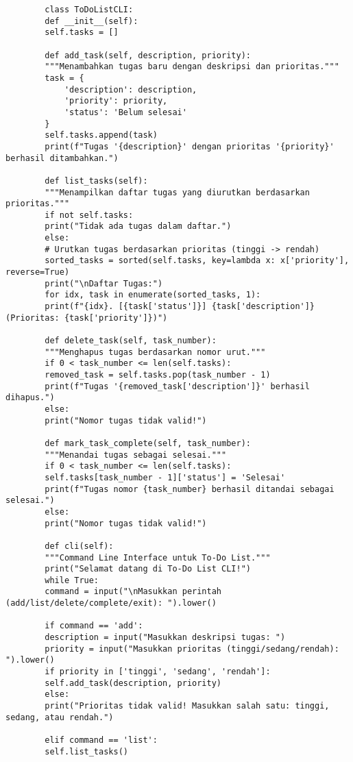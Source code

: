 \documentclass[12pt]{article}
\begin{document}
	
	\begin{lstlisting}
		class ToDoListCLI:
		def __init__(self):
		self.tasks = []
		
		def add_task(self, description, priority):
		"""Menambahkan tugas baru dengan deskripsi dan prioritas."""
		task = {
			'description': description,
			'priority': priority,
			'status': 'Belum selesai'
		}
		self.tasks.append(task)
		print(f"Tugas '{description}' dengan prioritas '{priority}' berhasil ditambahkan.")
		
		def list_tasks(self):
		"""Menampilkan daftar tugas yang diurutkan berdasarkan prioritas."""
		if not self.tasks:
		print("Tidak ada tugas dalam daftar.")
		else:
		# Urutkan tugas berdasarkan prioritas (tinggi -> rendah)
		sorted_tasks = sorted(self.tasks, key=lambda x: x['priority'], reverse=True)
		print("\nDaftar Tugas:")
		for idx, task in enumerate(sorted_tasks, 1):
		print(f"{idx}. [{task['status']}] {task['description']} (Prioritas: {task['priority']})")
		
		def delete_task(self, task_number):
		"""Menghapus tugas berdasarkan nomor urut."""
		if 0 < task_number <= len(self.tasks):
		removed_task = self.tasks.pop(task_number - 1)
		print(f"Tugas '{removed_task['description']}' berhasil dihapus.")
		else:
		print("Nomor tugas tidak valid!")
		
		def mark_task_complete(self, task_number):
		"""Menandai tugas sebagai selesai."""
		if 0 < task_number <= len(self.tasks):
		self.tasks[task_number - 1]['status'] = 'Selesai'
		print(f"Tugas nomor {task_number} berhasil ditandai sebagai selesai.")
		else:
		print("Nomor tugas tidak valid!")
		
		def cli(self):
		"""Command Line Interface untuk To-Do List."""
		print("Selamat datang di To-Do List CLI!")
		while True:
		command = input("\nMasukkan perintah (add/list/delete/complete/exit): ").lower()
		
		if command == 'add':
		description = input("Masukkan deskripsi tugas: ")
		priority = input("Masukkan prioritas (tinggi/sedang/rendah): ").lower()
		if priority in ['tinggi', 'sedang', 'rendah']:
		self.add_task(description, priority)
		else:
		print("Prioritas tidak valid! Masukkan salah satu: tinggi, sedang, atau rendah.")
		
		elif command == 'list':
		self.list_tasks()
		

\end{lstlisting}
\end{document}
